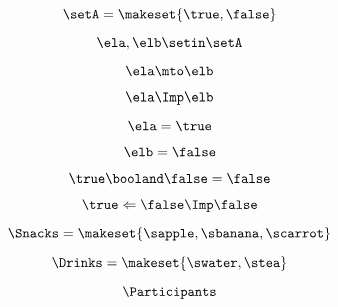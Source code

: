 {\begin{forslides}
        \begin{equation}
            \label{eq:combination-031}
            \setA = \makeset{ \true, \false }
        \end{equation}

        \begin{equation}
            \label{eq:combination-032}
            \ela, \elb  \setin \setA
        \end{equation}

        \begin{equation}
            \label{eq:combination-033}
            \ela \mto \elb
        \end{equation}

        \begin{equation}
            \label{eq:combination-034}
            \ela \Imp \elb
        \end{equation}

        \begin{equation}
            \label{eq:combination-035}
            \ela = \true
        \end{equation}

        \begin{equation}
            \label{eq:combination-036}
            \elb= \false
        \end{equation}

        \begin{equation}
            \label{eq:combination-037}
            \true \booland \false = \false
        \end{equation}

        \begin{equation}
            \label{eq:combination-038}
            \true \Leftarrow \false \Imp \false
        \end{equation}

        \begin{equation}
            \label{eq:combination-039}
            \Snacks=\makeset{\sapple,\sbanana,\scarrot}
        \end{equation}

        \begin{equation}
            \label{eq:combination-040}
            \Drinks=\makeset{\swater,\stea}
        \end{equation}

        \begin{equation}
            \label{eq:combination-041}
            \Participants
        \end{equation}


\end{forslides}}
